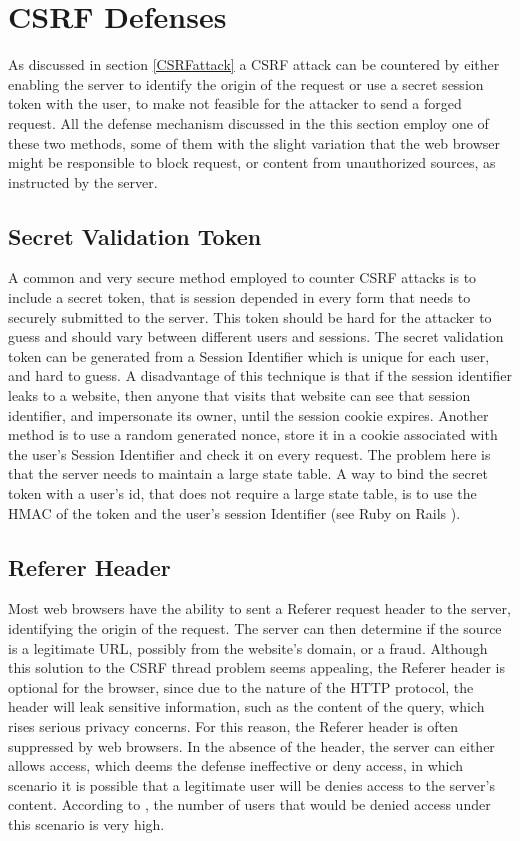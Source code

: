 \label{defenses}
\section{CSRF Defenses}
As discussed in section \ref{CSRFattack} a CSRF attack can be countered by either enabling the server to
identify the origin of the request or use a secret session token with the user, to make not feasible for
the attacker to send a forged request.  All the defense mechanism discussed in the this section employ one
of these two methods, some of them with the slight variation that the web browser might be responsible to block
request, or content from unauthorized sources, as instructed by the server.

\subsection{Secret Validation Token}
A common and very secure method employed to counter CSRF attacks is to include a secret token, that is session 
depended in every form that needs to securely submitted to the server.  This token should be hard for the attacker
to guess and should vary between different users and sessions.  The secret validation token can be generated from 
a Session Identifier which is unique for each user, and hard to guess. A disadvantage of this technique is that if 
the session identifier leaks to a website, then anyone that visits that website can see that session identifier, and 
impersonate its owner, until the session cookie expires. Another method is to use a random generated nonce,
store it in a cookie associated with the user's Session Identifier and check it on every request. The problem here is 
that the server needs to maintain a large state table. A way to bind the secret token with a user's id, that does not
require a large state table, is to use the HMAC of the token and the user's session Identifier (see Ruby on Rails 
\cite{website:ruby}).

\subsection{Referer Header}
Most web browsers have the ability to sent a Referer request header to the server, identifying the origin of the request.
The server can then determine if the source is a legitimate URL, possibly from the website's domain, or a fraud.  Although
this solution to the CSRF thread problem seems appealing, the Referer header is optional for the browser, since due to the
nature of the HTTP protocol, the header will leak sensitive information, such as the content of the query, which rises
serious privacy concerns.  For this reason, the Referer header is often suppressed by web browsers.  In the absence of the
header, the server can either allows access, which deems the defense ineffective or deny access, in which scenario it is
possible that a legitimate user will be denies access to the server's content.  According to \cite{Barth:2008:RDC:1455770.1455782},
the number of users that would be denied access under this scenario is very high.  

